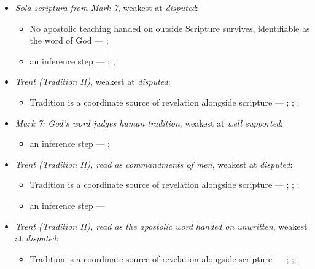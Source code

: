 \documentclass[11pt]{article}
\begin{document}
\begin{itemize}
\item \emph{Sola scriptura from Mark 7}, weakest at \emph{disputed}:
\begin{itemize}
\item No apostolic teaching handed on outside Scripture survives, identifiable as the word of God --- \cite[506]{whitaker-disputation-1849}; \cite[I.6]{westminster-confession-1647}
\item an inference step --- \cite{geiselmann-meaning-of-tradition-1966}; \cite[Vatican I (1870), Pastor Aeternus, ch. 4]{tanner-decrees-1990}; \cite{florovsky-bible-church-tradition-1972}
\end{itemize}
\item \emph{Trent (Tradition II)}, weakest at \emph{disputed}:
\begin{itemize}
\item Tradition is a coordinate source of revelation alongside scripture --- \cite[Trent, Session IV (1546), Decree on Sacred Books and Traditions]{tanner-decrees-1990}; \cite{mathison-shape-sola-scriptura-2001}; \cite{geiselmann-meaning-of-tradition-1966}; \cite{congar-tradition-and-traditions-1966}
\end{itemize}
\item \emph{Mark 7: God's word judges human tradition}, weakest at \emph{well supported}:
\begin{itemize}
\item an inference step --- \cite[Vatican II (1965), Dei Verbum 10]{tanner-decrees-1990}; \cite[IV.x.23]{calvin-institutes-1960}
\end{itemize}
\item \emph{Trent (Tradition II), read as commandments of men}, weakest at \emph{disputed}:
\begin{itemize}
\item Tradition is a coordinate source of revelation alongside scripture --- \cite[Trent, Session IV (1546), Decree on Sacred Books and Traditions]{tanner-decrees-1990}; \cite{mathison-shape-sola-scriptura-2001}; \cite{geiselmann-meaning-of-tradition-1966}; \cite{congar-tradition-and-traditions-1966}
\item an inference step --- \cite[IV.x.23]{calvin-institutes-1960}
\end{itemize}
\item \emph{Trent (Tradition II), read as the apostolic word handed on unwritten}, weakest at \emph{disputed}:
\begin{itemize}
\item Tradition is a coordinate source of revelation alongside scripture --- \cite[Trent, Session IV (1546), Decree on Sacred Books and Traditions]{tanner-decrees-1990}; \cite{mathison-shape-sola-scriptura-2001}; \cite{geiselmann-meaning-of-tradition-1966}; \cite{congar-tradition-and-traditions-1966}
\end{itemize}
\end{itemize}
\end{document}
